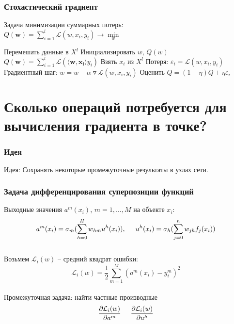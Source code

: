 \documentclass[10pt]{beamer}
\begin{document}
\begin{frame}\frametitle{Стохастический градиент}
  Задача минимизации суммарных потерь:\\
  ${Q}(\mathbf{w}) = \sum\limits_{i=1}^l \mathcal{L}(w, x_i, y_i) \rightarrow \min\limits_w$ \\
  \begin{algorithmic}[1]
     \State Перемешать данные в $X^l$
     \State Инициализировать $w$, ${Q}(w)$
     \State ${Q}(\mathbf{w}) = \sum\limits_{i=1}^l \mathcal{L}(\langle \mathbf{w}, \mathbf{x_i} \rangle y_i)$
       \State Взять $x_i$ из $X^l$
       \State Потеря: $\varepsilon_i = \mathcal{L}(w, x_i, y_i)$
       \State Градиентный шаг: $w =  w - \alpha \triangledown \mathcal{L}(w, x_i, y_i)$
       \State Оценить $Q = (1-\eta)Q + \eta \varepsilon_i$
     \EndRepeat
    \EndFunction
  \end{algorithmic}  
\end{frame}

\section{Сколько операций потребуется для вычисления градиента в точке?}

\begin{frame}\frametitle{Идея}
  \alert{Идея}: Сохранять некоторые промежуточные результаты в узлах сети.
\end{frame}

\begin{frame}\frametitle{Задача дифференцирования суперпозиции функций}
	Выходные значения $a^m(x_i)$, $m = 1,\dots,M$ на объекте $x_i$:\\
	$$a^m(x_i) = \sigma_m (\sum\limits_{h=0}^H w_{hm} u^h(x_i)), \hspace{5mm} u^h(x_i) = \sigma_h (\sum\limits_{j=0}^n w_{jh} f_j(x_i))$$\\
	Возьмем $\mathcal{L}_i(w)$ -- средний квадрат ошибки:\\
	$$\mathcal{L}_i(w) = \frac{1}{2} \sum\limits_{m=1}^M (a^m(x_i) - y_i^m)^2$$\\
	Промежуточная задача: найти частные производные\\
	$$\frac {\partial \mathcal{L}_i(w)}{\partial a^m} \hspace{5mm} \frac {\partial \mathcal{L}_i(w)}{\partial u^h}$$
\end{frame}
\end{document}
